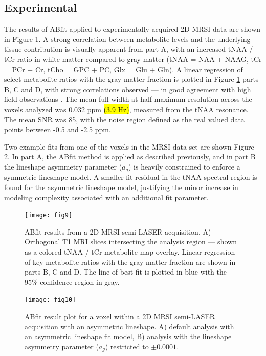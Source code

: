 \documentclass[num-refs]{wiley-article}
\newcommand{\revone}[2]{\hl{#1}\marginnote{\hl{#2}}}
\begin{document}
\subsection{Experimental}
The results of ABfit applied to experimentally acquired 2D MRSI data are shown in Figure \ref{mrsi_res}. A strong correlation between metabolite levels and the underlying tissue contribution is visually apparent from part A, with an increased tNAA / tCr ratio in white matter compared to gray matter (tNAA = NAA + NAAG, tCr = PCr + Cr, tCho = GPC + PC, Glx = Glu + Gln). A linear regression of select metabolite ratios with the gray matter fraction is plotted in Figure \ref{mrsi_res} parts B, C and D, with strong correlations observed --- in good agreement with high field observations \cite{Nassirpour2018, Hangel2018}. The mean full-width at half maximum resolution across the voxels analyzed was 0.032 ppm \revone{(3.9 Hz)}{R1.26}, measured from the tNAA resonance. The mean SNR was 85, with the noise region defined as the real valued data points between -0.5 and -2.5 ppm.

Two example fits from one of the voxels in the MRSI data set are shown Figure \ref{lineshape_res}. In part A, the ABfit method is applied as described previously, and in part B the lineshape asymmetry parameter ($a_{g}$) is heavily constrained to enforce a symmetric lineshape model. A smaller fit residual in the tNAA spectral region is found for the asymmetric lineshape model, justifying the minor increase in modeling complexity associated with an additional fit parameter.

\begin{figure}
  \begin{center}
    \texttt{[image: fig9]}
    \caption{ABfit results from a 2D MRSI semi-LASER acquisition. A) Orthogonal T1 MRI slices intersecting the analysis region --- shown as a colored tNAA / tCr metabolite map overlay. Linear regression of key metabolite ratios with the gray matter fraction are shown in parts B, C and D. The line of best fit is plotted in blue with the 95\% confidence region in gray.}
    \label{mrsi_res}
  \end{center}
\end{figure}

\begin{figure}
  \begin{center}
    \texttt{[image: fig10]}
    \caption{ABfit result plot for a voxel within a 2D MRSI semi-LASER acquisition with an asymmetric lineshape. A) default analysis with an asymmetric lineshape fit model, B) analysis with the lineshape asymmetry parameter ($a_{g}$) restricted to $\pm 0.0001$.}
    \label{lineshape_res}
  \end{center}
\end{figure}
\end{document}
